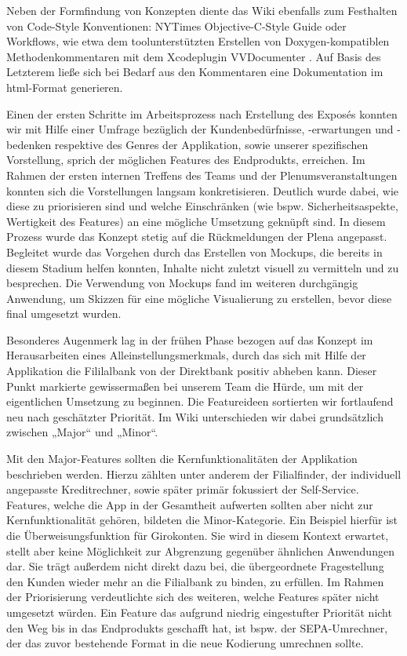 	Neben der Formfindung von Konzepten diente das Wiki ebenfalls zum Festhalten von Code-Style Konventionen: NYTimes Objective-C-Style Guide \citep{NYStyleGuide14} oder Workflows, wie etwa dem toolunterstützten Erstellen von Doxygen-kompatiblen Methodenkommentaren mit dem Xcodeplugin VVDocumenter \citep{Wang14}. Auf Basis des Letzterem ließe sich bei Bedarf aus den Kommentaren eine Dokumentation im html-Format generieren. 

	Einen der ersten Schritte im Arbeitsprozess nach Erstellung des Exposés konnten wir mit Hilfe einer Umfrage bezüglich der Kundenbedürfnisse, -erwartungen und -bedenken respektive des Genres der Applikation, sowie unserer spezifischen Vorstellung, sprich der möglichen Features des Endprodukts, erreichen. Im Rahmen der ersten internen Treffens des Teams und der Plenumsveranstaltungen konnten sich die Vorstellungen langsam konkretisieren. Deutlich wurde dabei, wie diese zu priorisieren sind und welche Einschränken (wie bspw. Sicherheitsaspekte, Wertigkeit des Features) an eine mögliche Umsetzung geknüpft sind. In diesem Prozess wurde das Konzept stetig auf die Rückmeldungen der Plena angepasst. Begleitet wurde das Vorgehen durch das Erstellen von Mockups, die bereits in diesem Stadium helfen konnten, Inhalte nicht zuletzt visuell zu vermitteln und zu besprechen. Die Verwendung von Mockups fand im weiteren durchgängig Anwendung, um Skizzen für eine mögliche Visualierung zu erstellen, bevor diese final umgesetzt wurden.

	Besonderes Augenmerk lag in der frühen Phase bezogen auf das Konzept im Herausarbeiten eines Alleinstellungsmerkmals, durch das sich mit Hilfe der Applikation die Fililalbank von der Direktbank positiv abheben kann. Dieser Punkt markierte gewissermaßen bei unserem Team die Hürde, um mit der eigentlichen Umsetzung zu beginnen. Die Featureideen sortierten wir fortlaufend neu nach geschätzter Priorität. Im Wiki unterschieden wir dabei grundsätzlich zwischen „Major“ und „Minor“.  
	
	Mit den Major-Features sollten die Kernfunktionalitäten der Applikation beschrieben werden. Hierzu zählten unter anderem der Filialfinder, der individuell angepasste Kreditrechner, sowie später primär fokussiert der Self-Service. Features, welche die App in der Gesamtheit aufwerten sollten aber nicht zur Kernfunktionalität gehören, bildeten die Minor-Kategorie. Ein Beispiel hierfür ist die Überweisungsfunktion für Girokonten. Sie wird in diesem Kontext erwartet, stellt aber keine Möglichkeit zur Abgrenzung gegenüber ähnlichen Anwendungen dar. Sie trägt außerdem nicht direkt dazu bei, die übergeordnete Fragestellung den Kunden wieder mehr an die Filialbank zu binden, zu erfüllen. Im Rahmen der Priorisierung verdeutlichte sich des weiteren, welche Features später nicht umgesetzt würden. Ein Feature das aufgrund niedrig eingestufter Priorität nicht den Weg bis in das Endprodukts geschafft hat, ist bspw. der SEPA-Umrechner, der das zuvor bestehende Format in die neue Kodierung umrechnen sollte. 
	
